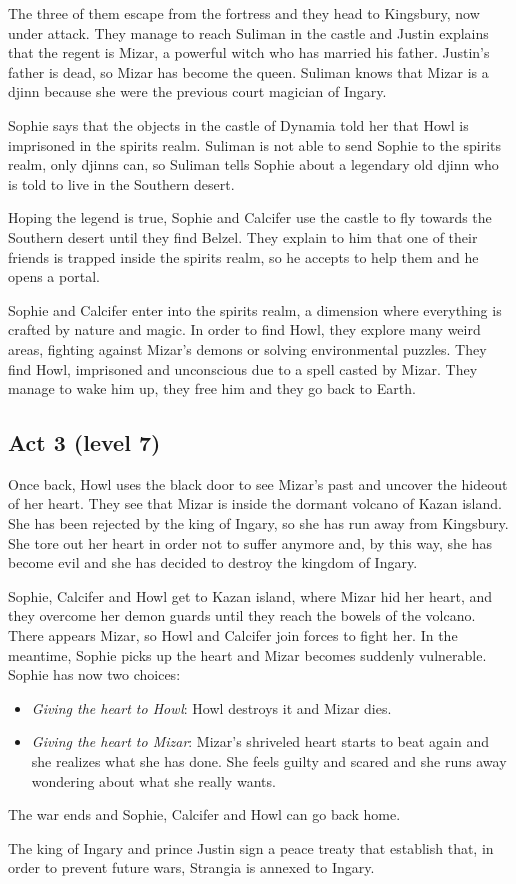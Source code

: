 The three of them escape from the fortress and they head to Kingsbury, now under attack. They manage to reach Suliman in the castle and Justin explains that the regent is Mizar, a powerful witch who has married his father. Justin's father is dead, so Mizar has become the queen. Suliman knows that Mizar is a djinn because she were the previous court magician of Ingary.

Sophie says that the objects in the castle of Dynamia told her that Howl is imprisoned in the spirits realm. Suliman is not able to send Sophie to the spirits realm, only djinns can, so Suliman tells Sophie about a legendary old djinn who is told to live in the Southern desert.

Hoping the legend is true, Sophie and Calcifer use the castle to fly towards the Southern desert until they find Belzel. They explain to him that one of their friends is trapped inside the spirits realm, so he accepts to help them and he opens a portal.

Sophie and Calcifer enter into the spirits realm, a dimension where everything is crafted by nature and magic. In order to find Howl, they explore many weird areas, fighting against Mizar's demons or solving environmental puzzles. They find Howl, imprisoned and unconscious due to a spell casted by Mizar. They manage to wake him up, they free him and they go back to Earth.

\subsection*{Act 3 (level 7)}
Once back, Howl uses the black door to see Mizar's past and uncover the hideout of her heart. They see that Mizar is inside the dormant volcano of Kazan island. She has been rejected by the king of Ingary, so she has run away from Kingsbury. She tore out her heart in order not to suffer anymore and, by this way, she has become evil and she has decided to destroy the kingdom of Ingary.

Sophie, Calcifer and Howl get to Kazan island, where Mizar hid her heart, and they overcome her demon guards until they reach the bowels of the volcano. There appears Mizar, so Howl and Calcifer join forces to fight her. In the meantime, Sophie picks up the heart and Mizar becomes suddenly vulnerable. Sophie has now two choices:
\begin{itemize}
\item \textit{Giving the heart to Howl}: Howl destroys it and Mizar dies.
\item \textit{Giving the heart to Mizar}: Mizar's shriveled heart starts to beat again and she realizes what she has done. She feels guilty and scared and she runs away wondering about what she really wants.
\end{itemize} 

The war ends and Sophie, Calcifer and Howl can go back home.

The king of Ingary and prince Justin sign a peace treaty that establish that, in order to prevent future wars, Strangia is annexed to Ingary.
